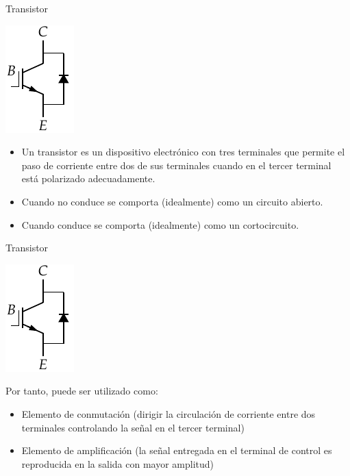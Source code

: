 \documentclass[xcolor={usenames,svgnames,dvipsnames}]{beamer}
\begin{document}
\begin{frame}[label={sec:org76c3191}]{Transistor}
\begin{center}
\includegraphics[height=0.3\textheight]{../figs/Transistor.pdf}
\end{center}

\begin{itemize}
\item Un transistor es un dispositivo electrónico con tres terminales que
permite el paso de corriente entre dos de sus terminales cuando en el
tercer terminal está polarizado adecuadamente.

\item Cuando \alert{no conduce} se comporta (idealmente) como un \alert{circuito abierto}.

\item Cuando \alert{conduce} se comporta (idealmente) como un \alert{cortocircuito}.
\end{itemize}
\end{frame}


\begin{frame}[label={sec:orgfdc0618}]{Transistor}
\begin{center}
\includegraphics[height=0.3\textheight]{../figs/Transistor.pdf}
\end{center}

Por tanto, puede ser utilizado como:

\begin{itemize}
\item \alert{Elemento de conmutación} (dirigir la circulación de corriente entre
dos terminales controlando la señal en el tercer terminal)

\item \alert{Elemento de amplificación} (la señal entregada en el terminal de
control es reproducida en la salida con mayor amplitud)
\end{itemize}
\end{frame}
\end{document}
